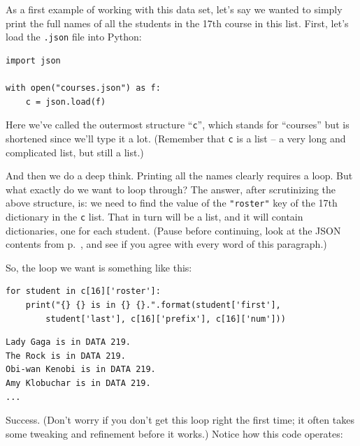 As a first example of working with this data set, let's say we wanted to simply
print the full names of all the students in the 17th course in this list.
First, let's load the \texttt{.json} file into Python:

\begin{Verbatim}[fontsize=\small,samepage=true,frame=single,framesep=3mm]
import json

with open("courses.json") as f:
    c = json.load(f)
\end{Verbatim}


Here we've called the outermost structure ``\texttt{c}'', which stands for
``courses'' but is shortened since we'll type it a lot. (Remember that
\texttt{c} is a list -- a very long and complicated list, but still a list.)

And then we do a deep think. Printing all the names clearly requires a loop.
But what exactly do we want to loop through? The answer, after scrutinizing the
above structure, is: we need to find the value of the \texttt{"roster"} key of
the 17th dictionary in the \texttt{c} list. That in turn will be a list, and it
will contain dictionaries, one for each student. (Pause before continuing, look
at the JSON contents from p.~\pageref{coursesJsonPretty}, and see if you agree
with every word of this paragraph.)

So, the loop we want is something like this:

\begin{Verbatim}[fontsize=\small,samepage=true,frame=single,framesep=3mm]
for student in c[16]['roster']: 
    print("{} {} is in {} {}.".format(student['first'], 
        student['last'], c[16]['prefix'], c[16]['num'])) 
\end{Verbatim}
\vspace{-.2in}

\begin{Verbatim}[fontsize=\small,samepage=true,frame=leftline,framesep=5mm,framerule=1mm]
Lady Gaga is in DATA 219.
The Rock is in DATA 219.
Obi-wan Kenobi is in DATA 219.
Amy Klobuchar is in DATA 219.
...
\end{Verbatim}

Success. (Don't worry if you don't get this loop right the first time; it often
takes some tweaking and refinement before it works.) Notice how this code
operates:


